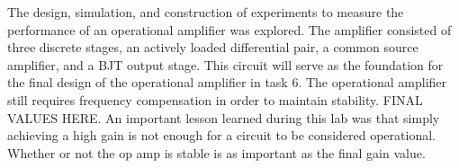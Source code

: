 

The design, simulation, and construction of experiments to measure the performance of an operational amplifier was explored. The amplifier consisted of three discrete stages, an actively loaded differential pair, a common source amplifier, and a BJT output stage. This circuit will serve as the foundation for the final design of the operational amplifier in task 6. The operational amplifier still requires frequency compensation in order to maintain stability. FINAL VALUES HERE. An important lesson learned during this lab was that simply achieving a high gain is not enough for a circuit to be considered operational. Whether or not the op amp is stable is as important as the final gain value.
